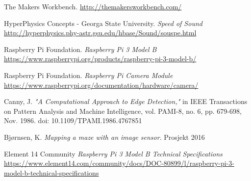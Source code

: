 \begin{thebibliography}{99}
The Makers Workbench. \url{http://themakersworkbench.com/}

HyperPhysics Concepts - Georga State University. \emph{Speed of Sound} \url{http://hyperphysics.phy-astr.gsu.edu/hbase/Sound/souspe.html}
    
Raspberry Pi Foundation. \emph{Raspberry Pi 3 Model B} \url{https://www.raspberrypi.org/products/raspberry-pi-3-model-b/}

Raspberry Pi Foundation. \emph{Raspberry Pi Camera Module} \url{https://www.raspberrypi.org/documentation/hardware/camera/}

	Canny, J. \emph{"A Computational Approach to Edge Detection,"} in IEEE Transactions on Pattern Analysis and Machine Intelligence, vol. PAMI-8, no. 6, pp. 679-698, Nov. 1986.
doi: 10.1109/TPAMI.1986.4767851

	Bjørnsen, K. \emph{Mapping a maze with an image sensor}. Prosjekt 2016
    
	Element 14 Community \emph{Raspberry Pi 3 Model B Technical Specifications} \url{https://www.element14.com/community/docs/DOC-80899/l/raspberry-pi-3-model-b-technical-specifications}

\end{thebibliography}